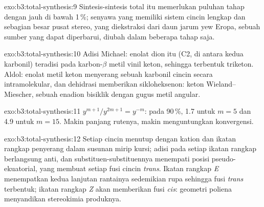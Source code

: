\begin{solution}{exo:b3:total-synthesis:9}
Sintesis-sintesis total itu memerlukan puluhan tahap dengan  jauh di bawah 1\,\%;
senyawa yang memiliki sistem cincin lengkap dan sebagian besar pusat stereo, yang diekstraksi dari
daun jarum yew Eropa, sebuah sumber yang dapat diperbarui, diubah dalam beberapa tahap saja.
\end{solution}

\begin{solution}{exo:b3:total-synthesis:10}
Adisi Michael: enolat dion itu (C2, di antara kedua karbonil) teradisi pada
karbon-$\beta$ metil vinil keton, sehingga terbentuk triketon. Aldol: enolat metil keton
menyerang sebuah karbonil cincin secara intramolekular, dan dehidrasi memberikan
sikloheksenon: keton Wieland--Miescher, sebuah enadion bisiklik dengan gugus metil
angular.
\end{solution}

\begin{solution}{exo:b3:total-synthesis:11}
$y^{m+1}/y^{2m+1} = y^{-m}$: pada 90\,\%, 1.7 untuk $m = 5$ dan 4.9 untuk $m = 15$. Makin panjang rutenya, makin
menguntungkan konvergensi.
\end{solution}

\begin{solution}{exo:b3:total-synthesis:12}
Setiap cincin menutup dengan kation dan ikatan rangkap penyerang dalam susunan
mirip kursi; adisi pada setiap ikatan rangkap berlangsung anti, dan substituen-substituennya menempati
posisi pseudo-ekuatorial, yang membuat setiap fusi cincin \textit{trans}. Ikatan rangkap \textit{E}
menempatkan kedua lanjutan rantainya sedemikian rupa sehingga fusi \textit{trans} terbentuk; ikatan rangkap \textit{Z} akan
memberikan fusi \textit{cis}: geometri poliena menyandikan stereokimia
produknya.
\end{solution}

